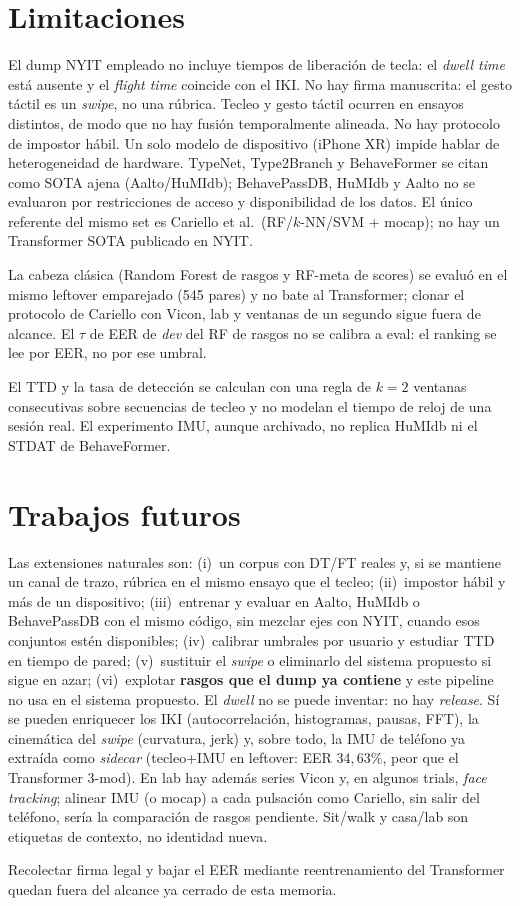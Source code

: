 \section{Limitaciones}

El dump NYIT empleado no incluye tiempos de liberación de tecla: el \textit{dwell time} está ausente y 
el \textit{flight time} coincide con el IKI. No hay firma manuscrita: el gesto táctil es un \textit{swipe},
no una rúbrica. Tecleo y gesto táctil ocurren en ensayos distintos, de modo que no hay fusión temporalmente 
alineada. No hay protocolo de impostor hábil. Un solo modelo de dispositivo (iPhone XR) impide hablar de 
heterogeneidad de hardware. TypeNet, Type2Branch y BehaveFormer se citan como SOTA ajena (Aalto/HuMIdb);
BehavePassDB, HuMIdb y Aalto no se evaluaron por restricciones de acceso y disponibilidad de los datos.
El único referente del mismo set es Cariello et al.\ (RF/$k$-NN/SVM + mocap);
no hay un Transformer SOTA publicado en NYIT.

La cabeza clásica (Random Forest de rasgos y RF-meta de scores) se evaluó en el mismo leftover emparejado
(545 pares) y no bate al Transformer; clonar el protocolo de Cariello con Vicon, lab y ventanas de un segundo
sigue fuera de alcance.
El $\tau$ de EER de \textit{dev} del RF de rasgos no se calibra a eval: el ranking se lee por EER, no por ese umbral.

El TTD y la tasa de detección se calculan con una regla de $k=2$ ventanas consecutivas sobre secuencias de
tecleo y no modelan el tiempo de reloj de una sesión real. El experimento IMU, aunque archivado, no
replica HuMIdb ni el STDAT de BehaveFormer.

\section{Trabajos futuros}

Las extensiones naturales son: (i)~un corpus con DT/FT reales y, si se mantiene un canal de trazo,
rúbrica en el mismo ensayo que el tecleo; (ii)~impostor hábil y más de un dispositivo;
(iii)~entrenar y evaluar en Aalto, HuMIdb o BehavePassDB con el mismo código, sin mezclar ejes con NYIT,
cuando esos conjuntos estén disponibles; (iv)~calibrar
umbrales por usuario y estudiar TTD en tiempo de pared; (v)~sustituir el \textit{swipe} o
eliminarlo del sistema propuesto si sigue en azar; (vi)~explotar \textbf{rasgos que el dump ya contiene}
y este pipeline no usa en el sistema propuesto. El \textit{dwell} no se puede inventar: no hay
\textit{release}. Sí se pueden enriquecer los IKI (autocorrelación, histogramas, pausas, FFT), la
cinemática del \textit{swipe} (curvatura, jerk) y, sobre todo, la IMU de teléfono ya extraída como
\textit{sidecar} (tecleo+IMU en leftover: EER $34{,}63\%$, peor que el Transformer 3-mod). En lab hay
además series Vicon y, en algunos trials, \textit{face tracking}; alinear IMU (o mocap) a cada pulsación
como Cariello, sin salir del teléfono, sería la comparación de rasgos pendiente. Sit/walk y casa/lab son
etiquetas de contexto, no identidad nueva.

Recolectar firma legal y bajar el EER mediante reentrenamiento del Transformer quedan fuera del alcance
ya cerrado de esta memoria.
